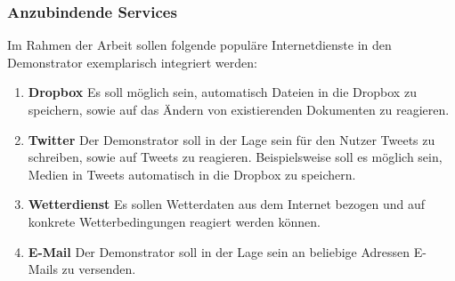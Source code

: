 \subsubsection{Anzubindende Services}
\label{subsec:anzubindende_services}
Im Rahmen der Arbeit sollen folgende populäre Internetdienste in den Demonstrator exemplarisch integriert werden:
\begin{enumerate}
\item \textbf{Dropbox}\cite{dropbox} Es soll möglich sein, automatisch Dateien in die Dropbox zu speichern, sowie auf das Ändern von existierenden Dokumenten zu reagieren.
\item \textbf{Twitter}\cite{twitter} Der Demonstrator soll in der Lage sein für den Nutzer Tweets zu schreiben, sowie auf Tweets zu reagieren. Beispielsweise soll es möglich sein, Medien in Tweets automatisch in die Dropbox zu speichern.
\item \textbf{Wetterdienst}\cite{wetterapi} Es sollen Wetterdaten aus dem Internet bezogen und auf konkrete Wetterbedingungen reagiert werden können.
\item \textbf{E-Mail} Der Demonstrator soll in der Lage sein an beliebige Adressen E-Mails zu versenden.
\end{enumerate}



